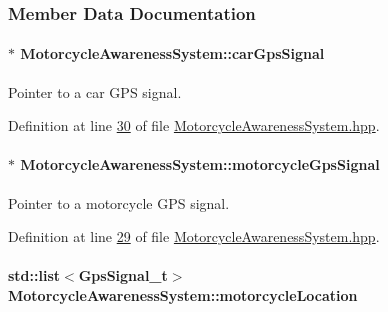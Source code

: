 \subsubsection{Member Data Documentation}
\hypertarget{classMotorcycleAwarenessSystem_a9a8185e00b60d0be58bfa76166063128}{
\paragraph[{car\-Gps\-Signal}]{$\ast$ Motorcycle\-Awareness\-System\-::car\-Gps\-Signal\hspace{0.3cm}{\ttfamily [private]}}}\label{classMotorcycleAwarenessSystem_a9a8185e00b60d0be58bfa76166063128}


Pointer to a car G\-P\-S signal. 



Definition at line \hyperlink{MotorcycleAwarenessSystem_8hpp_source_l00030}{30} of file \hyperlink{MotorcycleAwarenessSystem_8hpp_source}{Motorcycle\-Awareness\-System.\-hpp}.

\hypertarget{classMotorcycleAwarenessSystem_ab281a3993b574923b2f379ed0477b2d4}{
\paragraph[{motorcycle\-Gps\-Signal}]{$\ast$ Motorcycle\-Awareness\-System\-::motorcycle\-Gps\-Signal\hspace{0.3cm}{\ttfamily [private]}}}\label{classMotorcycleAwarenessSystem_ab281a3993b574923b2f379ed0477b2d4}


Pointer to a motorcycle G\-P\-S signal. 



Definition at line \hyperlink{MotorcycleAwarenessSystem_8hpp_source_l00029}{29} of file \hyperlink{MotorcycleAwarenessSystem_8hpp_source}{Motorcycle\-Awareness\-System.\-hpp}.

\hypertarget{classMotorcycleAwarenessSystem_af6becfeb1d11b467cb80a94a8e6940ac}{
\paragraph[{motorcycle\-Location}]{\setlength{\rightskip}{0pt plus 5cm}std\-::list$<${\bf Gps\-Signal\-\_\-t}$>$ Motorcycle\-Awareness\-System\-::motorcycle\-Location\hspace{0.3cm}{\ttfamily [private]}}}\label{classMotorcycleAwarenessSystem_af6becfeb1d11b467cb80a94a8e6940ac}


